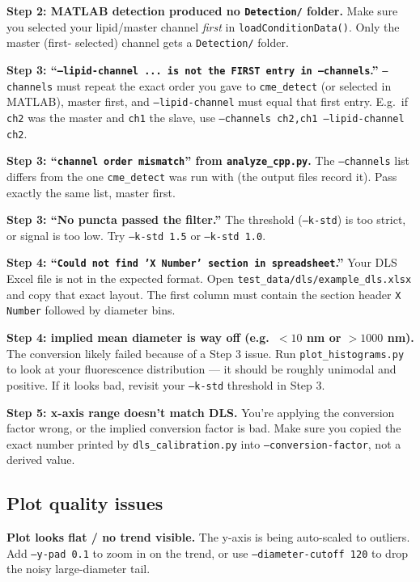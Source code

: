 \documentclass[11pt]{article}
\newcommand{\code}[1]{\texttt{#1}}
\begin{document}
\textbf{Step 2: MATLAB detection produced no \code{Detection/}
folder.} Make sure you selected your lipid/master channel
\emph{first} in \code{loadConditionData()}. Only the master (first-
selected) channel gets a \code{Detection/} folder.

\begin{sloppypar}
\textbf{Step 3: ``\code{--lipid-channel ... is not the FIRST entry
in --channels}.''} \code{--channels} must repeat the exact order you
gave to \code{cme\_detect} (or selected in MATLAB), master first, and
\code{--lipid-channel} must equal that first entry. E.g.\ if
\code{ch2} was the master and \code{ch1} the slave, use
\code{--channels ch2,ch1 --lipid-channel ch2}.
\end{sloppypar}

\textbf{Step 3: ``\code{channel order mismatch}'' from
\code{analyze\_cpp.py}.} The \code{--channels} list differs from the
one \code{cme\_detect} was run with (the output files record it).
Pass exactly the same list, master first.

\textbf{Step 3: ``No puncta passed the filter.''} The threshold
(\code{--k-std}) is too strict, or signal is too low. Try
\code{--k-std 1.5} or \code{--k-std 1.0}.

\textbf{Step 4: ``\code{Could not find 'X Number' section in
spreadsheet}.''} Your DLS Excel file is not in the expected format.
Open \code{test\_data/dls/example\_dls.xlsx} and copy that exact
layout. The first column must contain the section header
\code{X Number} followed by diameter bins.

\textbf{Step 4: implied mean diameter is way off (e.g.\ $<10$ nm or
$>1000$ nm).} The conversion likely failed because of a Step 3
issue. Run \code{plot\_histograms.py} to look at your fluorescence
distribution --- it should be roughly unimodal and positive. If it
looks bad, revisit your \code{--k-std} threshold in Step 3.

\textbf{Step 5: x-axis range doesn't match DLS.} You're applying the
conversion factor wrong, or the implied conversion factor is bad.
Make sure you copied the exact number printed by
\code{dls\_calibration.py} into \code{--conversion-factor}, not a
derived value.

\subsection{Plot quality issues}

\textbf{Plot looks flat / no trend visible.} The y-axis is being
auto-scaled to outliers. Add \code{--y-pad 0.1} to zoom in on the
trend, or use \code{--diameter-cutoff 120} to drop the noisy
large-diameter tail.
\end{document}
